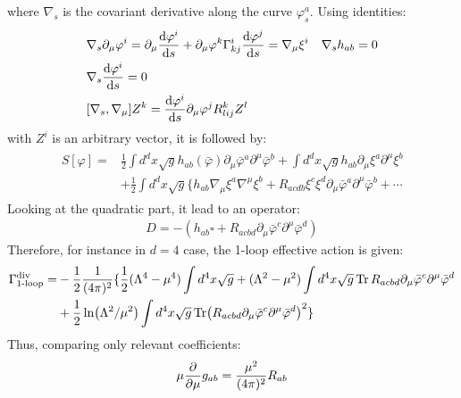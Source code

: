 where $\nabla _{s}$ is the covariant derivative along the curve $\varphi _{s} ^{a}$. Using identities:
\begin{align}
    &\nabla_{s} \partial _{\mu} \varphi ^{i} = \partial _{\mu} \dv{\varphi^{i}}{s} + \partial_{\mu} \varphi ^{k} \Gamma _{kj}^{i} \dv{\varphi^{j}}{s} = \nabla _{\mu} \xi ^{i} 
    & \nabla _{s} h_{ab} = 0 \\
    & \nabla _{s} \dv{\varphi ^{i}} {s} = 0 \\
    &[\nabla _{s}, \nabla _{\mu}] Z^{k} = \dv{\varphi ^{i}}{s} \partial _{\mu} \varphi ^{j} R_{lij} ^{k} Z^{l}
\end{align}
with $Z^{i}$ is an arbitrary vector, it is followed by:
\begin{align}
    \begin{split}
    S[\varphi] = & \frac{1}{2} \int d^{d}x \sqrt{g} h_{ab}(\bar{\varphi}) \partial _{\mu} \bar{\varphi}^{a} \partial ^{\mu} \bar{\varphi} ^{b} + \int d^{d}x \sqrt{g} h_{ab} \partial _{\mu} \xi ^{a} \partial ^{\mu} \xi ^{b} \\
    &+ \frac{1}{2} \int d^{d}x \sqrt{g} \lbrace h_{ab} \nabla_{\mu} \xi^{a} \nabla ^{\mu} \xi ^{b} + R_{acdb} \xi ^{c}\xi^{d} \partial _{\mu}\bar{\varphi}^{a} \partial ^{\mu} \bar{\varphi} ^{b} + \cdots
    \end{split} 
\end{align}
Looking at the quadratic part, it lead to an operator:
\begin{align}
    D = -(h_{ab} \square + R_{acbd} \partial _{\mu} \bar{\varphi}^{c} \partial ^{\mu} \bar{\varphi}^{d} )
\end{align}
Therefore, for instance in $d=4$ case, the 1-loop effective action is given:
\begin{align}
    \begin{split}
    \Gamma _{\text{1-loop}} ^{\text{div}} = &-\frac{1}{2} \frac{1}{(4\pi)^2}\lbrace \frac{1}{2}(\Lambda^4 - \mu ^{4}) \int d^{4}x \sqrt{g} + (\Lambda ^{2} - \mu ^{2}) \int d^{4}x \sqrt{g} \Tr R_{acbd} \partial _{\mu} \bar{\varphi}^{c} \partial ^{\mu} \bar{\varphi}^{d} \\ 
    &+ \frac{1}{2} \ln (\Lambda ^{2} / \mu ^{2})\int d^{4}x  \sqrt{g} \Tr (R_{acbd} \partial _{\mu} \bar{\varphi}^{c} \partial ^{\mu} \bar{\varphi}^{d}) ^{2} \rbrace
    \end{split}
\end{align}
Thus, comparing only relevant coefficients:
\begin{align}
    \mu \pdv{\mu} g_{ab} = \frac{\mu ^{2}} {(4\pi)^2} R_{ab}
\end{align}
